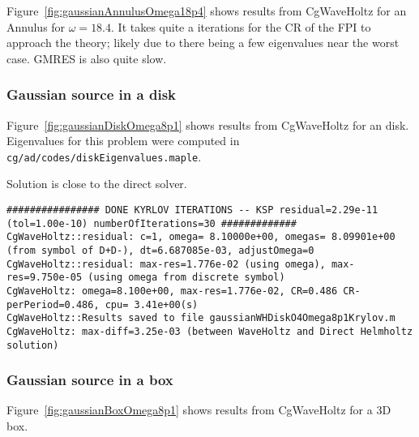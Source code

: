 Figure~\ref{fig:gaussianAnnulusOmega18p4} shows results from CgWaveHoltz for an Annulus for $\omega=18.4$.
It takes quite a iterations for the CR of the FPI to approach the theory; likely due to there being a few
eigenvalues near the worst case. GMRES is also quite slow. 



\clearpage
\subsubsection{Gaussian source in a disk}
Figure~\ref{fig:gaussianDiskOmega8p1} shows results from CgWaveHoltz for an disk.
Eigenvalues for this problem were computed in \texttt{cg/ad/codes/diskEigenvalues.maple}.



\mni
Solution is close to the direct solver.
\begin{Verbatim}[fontsize=\scriptsize]
 ################ DONE KYRLOV ITERATIONS -- KSP residual=2.29e-11 (tol=1.00e-10) numberOfIterations=30 #############
CgWaveHoltz::residual: c=1, omega= 8.10000e+00, omegas= 8.09901e+00 (from symbol of D+D-), dt=6.687085e-03, adjustOmega=0
CgWaveHoltz::residual: max-res=1.776e-02 (using omega), max-res=9.750e-05 (using omega from discrete symbol)
CgWaveHoltz: omega=8.100e+00, max-res=1.776e-02, CR=0.486 CR-perPeriod=0.486, cpu= 3.41e+00(s)
CgWaveHoltz::Results saved to file gaussianWHDiskO4Omega8p1Krylov.m
CgWaveHoltz: max-diff=3.25e-03 (between WaveHoltz and Direct Helmholtz solution)
\end{Verbatim}


\clearpage
\subsubsection{Gaussian source in a box}
Figure~\ref{fig:gaussianBoxOmega8p1} shows results from CgWaveHoltz for a 3D box.



